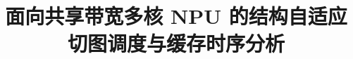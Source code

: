 \documentclass[bwprint]{gmcmthesis}
\title{面向共享带宽多核 NPU 的结构自适应切图调度与缓存时序分析}
\numberwithin{equation}{section}
\numberwithin{figure}{section}
\numberwithin{table}{section}
\begin{document}
\maketitle

\pagestyle{plain}
\maketoc
\clearpage














\begin{appendices}

\end{appendices}
\end{document}
